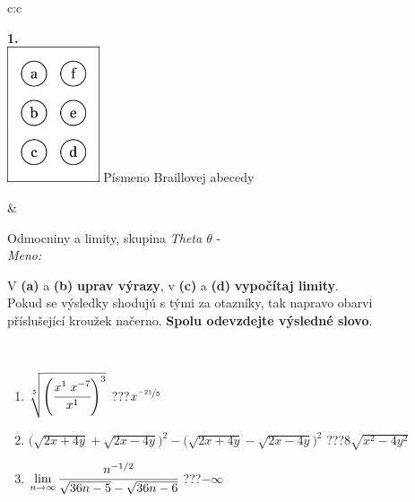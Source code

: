 \documentclass[10pt]{report}
\begin{document}
\begin{tabular}{c:c}
\begin{minipage}[c][104.5mm][t]{0.5\linewidth}
\begin{center}
\begin{minipage}{0.20\linewidth}
\begin{center}
{\Huge\bfseries 1.} \\[2mm]
\includegraphics[height=40mm]{../images/braille.png}
{\small Písmeno Braillovej abecedy}
\end{center}
\end{minipage}
\end{center}
\end{minipage}
&
\begin{minipage}[c][104.5mm][t]{0.5\linewidth}
\begin{center}
\vspace{7mm}
{\huge Odmocniny a limity, skupina \textit{Theta $\theta$} -}\\[5mm]
\textit{Meno:}\phantom{xxxxxxxxxxxxxxxxxxxxxxxxxxxxxxxxxxxxxxxxxxxxxxxxxxxxxxxxxxxxxxxxx}\\[5mm]
\begin{minipage}{0.95\linewidth}
\begin{center}
V \textbf{(a)} a \textbf{(b)} \textbf{uprav výrazy}, v \textbf{(c)} a \textbf{(d)} \textbf{vypočítaj limity}.\\Pokud se výsledky shodujú s tými za otazníky, tak napravo obarvi\\příslušející kroužek načerno. \textbf{Spolu odevzdejte výsledné slovo}.
\end{center}
\end{minipage}
\\[1mm]
\begin{minipage}{0.79\linewidth}
\begin{center}
\begin{varwidth}{\linewidth}
\begin{enumerate}
\small
\item $\sqrt[5]{\left(\cfrac{x^{1}\;x^{-7}}{x^{1}}\right)^{3}}$\quad \dotfill\; ???\;\dotfill \quad $x^{\nicefrac{-21}{5}}$
\item {\footnotesize{\scriptsize$\big(\sqrt{2x+4y}+\sqrt{2x-4y}\big)^2-\big(\sqrt{2x+4y}-\sqrt{2x-4y}\big)^2$}\quad \dotfill\; ???\;\dotfill \quad $8\sqrt{x^2-4y^2}$}
\item $\lim\limits_{n\to\infty}\cfrac{n^{-1/2}}{\sqrt{36n-5}-\sqrt{36n-6}}$\quad \dotfill\; ???\;\dotfill \quad $-\infty$

\end{enumerate}
\end{varwidth}
\end{center}
\end{minipage}
\end{center}
\end{minipage}
\end{tabular}
\end{document}
